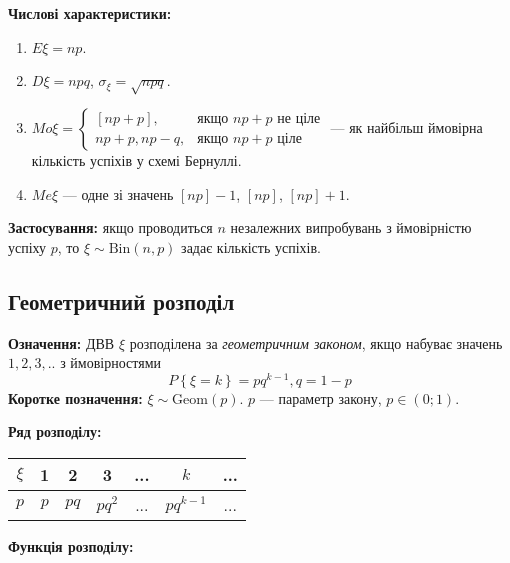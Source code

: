 \noindent\textbf{Числові характеристики:}
\begin{enumerate}
    \item $E\xi = np$.
    \item $D\xi = npq$, $\sigma_\xi = \sqrt{npq}$.
    \item ${Mo}\xi = \begin{cases}
        \left[np+p\right], & \text{якщо } np+p \text{ не ціле}\\
        np+p, np-q, & \text{якщо } np+p \text{ ціле}
    \end{cases}$ --- як найбільш ймовірна кількість успіхів у схемі Бернуллі.
    \item ${Me}\xi$ --- одне зі значень $\left[np\right] - 1$, $\left[np\right]$, $\left[np\right] + 1$.
\end{enumerate}

\noindent\textbf{Застосування:} якщо проводиться $n$ незалежних випробувань з ймовірністю успіху $p$, 
то $\xi \sim \mathrm{Bin}(n, p)$ задає кількість успіхів.

\subsection{Геометричний розподіл}
\noindent\textbf{Означення:}
    ДВВ $\xi$ розподілена за \emph{геометричним законом}, 
    якщо набуває значень $1,2,3,..$ з ймовірностями \begin{equation}
        P\left\{\xi = k\right\} = pq^{k-1}, q = 1 - p
    \end{equation}
    \textbf{Коротке позначення:} $\xi \sim \mathrm{Geom}(p)$.
    $p$ --- параметр закону, $p\in (0;1)$.

\noindent\textbf{Ряд розподілу:}

\begin{tabular}{c|c|c|c|c|c|c}
    $\xi$ & 1 & 2 & 3 & ... & $k$ & ... \\
    \hline
    $p$ & $p$ & $pq$ & $pq^2$ & ... & $pq^{k-1}$ & ...
\end{tabular}

\noindent\textbf{Функція розподілу:}

